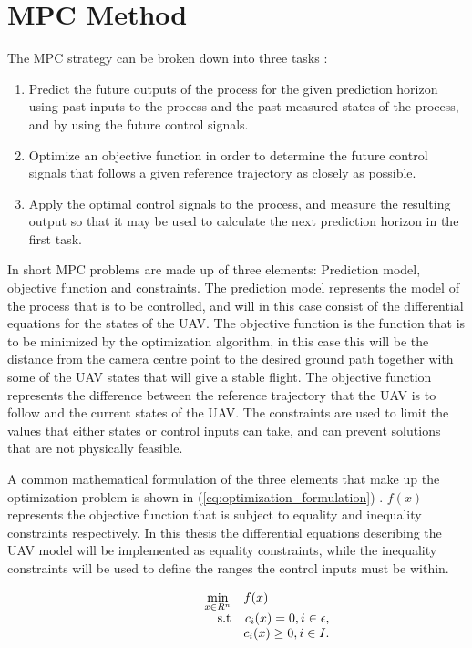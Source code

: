 \section{MPC Method}

The MPC strategy can be broken down into three tasks \cite{mpcCAMACHO}:

\begin{enumerate}
	\item Predict the future outputs of the process for the given prediction horizon using past inputs to the process and the past measured states of the process, and by using the future control signals.
	\item Optimize an objective function in order to determine the future control signals that follows a given reference trajectory as closely as possible.
	\item Apply the optimal control signals to the process, and measure the resulting output so that it may be used to calculate the next prediction horizon in the first task.
\end{enumerate}

In short MPC problems are made up of three elements: Prediction model, objective function and constraints. The prediction model represents the model of the process that is to be controlled, and will in this case consist of the differential equations for the states of the UAV. The objective function is the function that is to be minimized by the optimization algorithm, in this case this will be the distance from the camera centre point to the desired ground path together with some of the UAV states that will give a stable flight. The objective function represents the difference between the reference trajectory that the UAV is to follow and the current states of the UAV. The constraints are used to limit the values that either states or control inputs can take, and can prevent solutions that are not physically feasible.

A common mathematical formulation of the three elements that make up the optimization problem is shown in (\ref{eq:optimization_formulation}) \cite{nocedalOPTIMIZATION}. $f(x)$ represents the objective function that is subject to equality and inequality constraints respectively. In this thesis the differential equations describing the UAV model will be implemented as equality constraints, while the inequality constraints will be used to define the ranges the control inputs must be within.

\begin{equation}
	\label{eq:optimization_formulation}
	\begin{array}{rrclcl}
		\displaystyle \min_{x \in R^n} & \multicolumn{3}{l}{f(x)} \\
		\textrm{s.t}
		& c_i(x) = 0, i \in \epsilon, \\
		& c_i(x) \geq 0, i \in I.
	\end{array}
\end{equation}